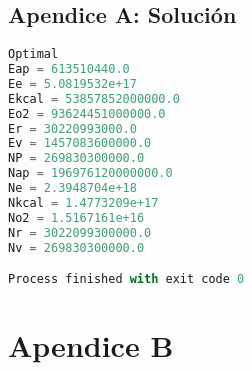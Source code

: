 \documentclass[12pt]{report}
\begin{document}
\subsection*{Apendice A: Soluci\'on}


\begin{lstlisting}[language=Python, frame=single, basicstyle=\tiny]
Optimal
Eap = 613510440.0
Ee = 5.0819532e+17
Ekcal = 53857852000000.0
Eo2 = 93624451000000.0
Er = 30220993000.0
Ev = 1457083600000.0
NP = 269830300000.0
Nap = 196976120000000.0
Ne = 2.3948704e+18
Nkcal = 1.4773209e+17
No2 = 1.5167161e+16
Nr = 3022099300000.0
Nv = 269830300000.0

Process finished with exit code 0
\end{lstlisting}

\newpage
\section*{Apendice B}
\end{document}
